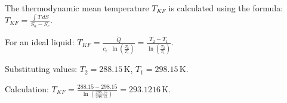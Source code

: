 The thermodynamic mean temperature \( T_{KF} \) is calculated using the formula:  
\( T_{KF} = \frac{\int T \, dS}{S_a - S_e} \).  

For an ideal liquid:  
\( T_{KF} = \frac{\dot{Q}}{c_{i} \cdot \ln \left( \frac{T_2}{T_1} \right)} = \frac{T_2 - T_1}{\ln \left( \frac{T_2}{T_1} \right)} \).  

Substituting values:  
\( T_2 = 288.15 \, \text{K} \), \( T_1 = 298.15 \, \text{K} \).  

Calculation:  
\( T_{KF} = \frac{288.15 - 298.15}{\ln \left( \frac{288.15}{298.15} \right)} = 293.1216 \, \text{K} \).